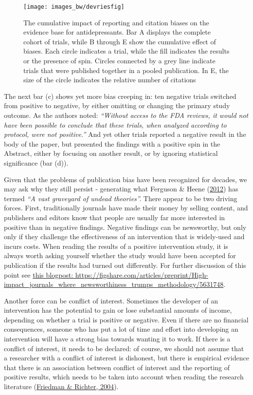 \documentclass{krantz}
\begin{document}
\begin{figure}
\texttt{[image: images\_bw/devriesfig]} \caption{The cumulative impact of reporting and citation biases on the evidence base for antidepressants. Bar A displays the complete cohort of trials, while B through E show the cumulative effect of biases. Each circle indicates a trial, while the fill indicates the results or the presence of spin. Circles connected by a grey line indicate trials that were published together in a pooled publication. In E, the size of the circle indicates the relative number of citations}\label{fig:devriesfig}
\end{figure}

The next bar (c) shows yet more bias creeping in: ten negative trials switched from positive to negative, by either omitting or changing the primary study outcome. As the authors noted: \emph{``Without access to the FDA reviews, it would not have been possible to conclude that these trials, when analyzed according to protocol, were not positive.''} And yet other trials reported a negative result in the body of the paper, but presented the findings with a positive spin in the Abstract, either by focusing on another result, or by ignoring statistical significance (bar (d)).

Given that the problems of publication bias have been recognized for decades, we may ask why they still persist - generating what Ferguson \& Heene (\protect\hyperlink{ref-ferguson2012}{2012}) has termed \emph{``A vast graveyard of undead theories''.} There appear to be two driving forces. First, traditionally journals have made their money by selling content, and publishers and editors know that people are usually far more interested in positive than in negative findings. Negative findings can be newsworthy, but only only if they challenge the effectiveness of an intervention that is widely-used and incurs costs. When reading the results of a positive intervention study, it is always worth asking yourself whether the study would have been accepted for publication if the results had turned out differently. For further discussion of this point see \href{https://figshare.com/articles/preprint/High-impact_journals_where_newsworthiness_trumps_methodology/5631748}{this blogpost: https://figshare.com/articles/preprint/High-impact\_journals\_where\_newsworthiness\_trumps\_methodology/5631748}.

Another force can be conflict of interest. Sometimes the developer of an intervention has the potential to gain or lose substantial amounts of income, depending on whether a trial is positive or negative. Even if there are no financial consequences, someone who has put a lot of time and effort into developing an intervention will have a strong bias towards wanting it to work. If there is a conflict of interest, it needs to be declared: of course, we should not assume that a researcher with a conflict of interest is dishonest, but there is empirical evidence that there is an association between conflict of interest and the reporting of positive results, which needs to be taken into account when reading the research literature (\protect\hyperlink{ref-friedman2004}{Friedman \& Richter, 2004}).
\end{document}
